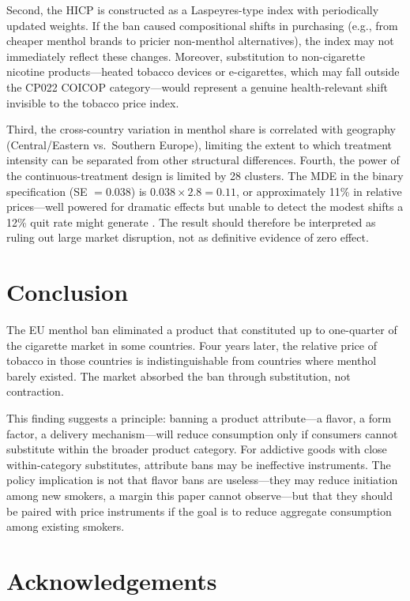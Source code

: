 \documentclass[12pt]{article}
\begin{document}
Second, the HICP is constructed as a Laspeyres-type index with periodically updated weights. If the ban caused compositional shifts in purchasing (e.g., from cheaper menthol brands to pricier non-menthol alternatives), the index may not immediately reflect these changes. Moreover, substitution to non-cigarette nicotine products---heated tobacco devices or e-cigarettes, which may fall outside the CP022 COICOP category---would represent a genuine health-relevant shift invisible to the tobacco price index.

Third, the cross-country variation in menthol share is correlated with geography (Central/Eastern vs.\ Southern Europe), limiting the extent to which treatment intensity can be separated from other structural differences. Fourth, the power of the continuous-treatment design is limited by 28 clusters. The MDE in the binary specification (SE $= 0.038$) is $0.038 \times 2.8 = 0.11$, or approximately 11\% in relative prices---well powered for dramatic effects but unable to detect the modest shifts a 12\% quit rate might generate \citep{zatonski2021menthol}. The result should therefore be interpreted as ruling out large market disruption, not as definitive evidence of zero effect.


\section{Conclusion}

The EU menthol ban eliminated a product that constituted up to one-quarter of the cigarette market in some countries. Four years later, the relative price of tobacco in those countries is indistinguishable from countries where menthol barely existed. The market absorbed the ban through substitution, not contraction.

This finding suggests a principle: banning a product attribute---a flavor, a form factor, a delivery mechanism---will reduce consumption only if consumers cannot substitute within the broader product category. For addictive goods with close within-category substitutes, attribute bans may be ineffective instruments. The policy implication is not that flavor bans are useless---they may reduce initiation among new smokers, a margin this paper cannot observe---but that they should be paired with price instruments if the goal is to reduce aggregate consumption among existing smokers.


\section*{Acknowledgements}
\end{document}
